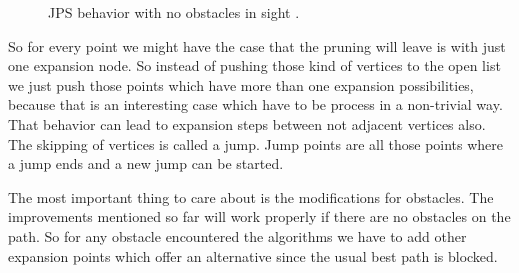 \documentclass{article}
\begin{document}
    \begin{figure}[!htb]
        \centering
        \hfill
        \caption{JPS behavior with no obstacles in sight \cite{JPSexplained}.}
    \end{figure}

    So for every point we might have the case that the pruning will leave is with just one expansion node. So instead of pushing those kind of vertices to the open list we just push those points which have more than one expansion possibilities, because that is an interesting case which have to be process in a non-trivial way. That behavior can lead to expansion steps between not adjacent vertices also. The skipping of vertices is called a jump. Jump points are all those points where a jump ends and a new jump can be started.

    The most important thing to care about is the modifications for obstacles. The improvements mentioned so far will work properly if there are no obstacles on the path. So for any obstacle encountered the algorithms we have to add other expansion points which offer an alternative since the usual best path is blocked.
\end{document}
